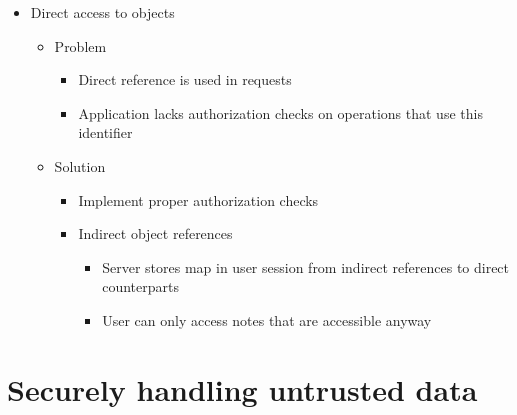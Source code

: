 \documentclass[12pt,titlepage,a4paper]{report}
\begin{document}
\begin{itemize}
		\item Direct access to objects
		\begin{itemize}
			\item Problem
			\begin{itemize}
				\item Direct reference is used in requests
				\item Application lacks authorization checks on operations that use this identifier
			\end{itemize}
			\item Solution
			\begin{itemize}
				\item Implement proper authorization checks
				\item Indirect object references
				\begin{itemize}
					\item Server stores map in user session from indirect references to direct counterparts
					\item User can only access notes that are accessible anyway
				\end{itemize}
			\end{itemize}
		\end{itemize}
	\end{itemize}
	
	\section{Securely handling untrusted data}
\end{document}
